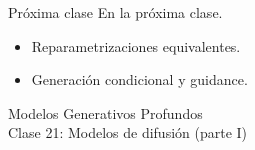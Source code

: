 \documentclass{beamer}
\begin{document}
\begin{frame}{Próxima clase}
    En la próxima clase.
    \begin{itemize}
        \item Reparametrizaciones equivalentes.
        \item Generación condicional y guidance.
    \end{itemize}
\end{frame}

\begin{frame}
    \centering
    \Large{Modelos Generativos Profundos}\\
    \large{Clase 21: Modelos de difusión (parte I)}
\end{frame}
\end{document}
